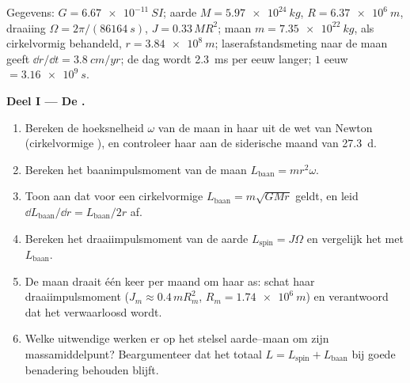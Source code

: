 \begin{problem}
\label{pb:b1:angular-momentum:1}
Gegevens: $G = \qty{6.67e-11}{SI}$; aarde $M = \qty{5.97e24}{kg}$, $R =
\qty{6.37e6}{m}$, draaiing $\Omega = 2\pi/(\qty{86164}{s})$, 
$J = 0.33\,MR^2$; maan $m = \qty{7.35e22}{kg}$,  als
cirkelvormig behandeld, $r = \qty{3.84e8}{m}$; laserafstandsmeting naar de maan geeft
$\dd r/\dd t = \qty{3.8}{cm/yr}$; de dag wordt \qty{2.3}{ms} per
eeuw langer; $1$ eeuw $= \qty{3.16e9}{s}$.

\medskip
\noindent\textbf{Deel I --- De .}
\begin{enumerate}
  \item Bereken de hoeksnelheid $\omega$ van de maan in haar  uit
        de wet van Newton (cirkelvormige ), en controleer haar aan de
        siderische maand van \qty{27.3}{d}.
  \item Bereken het baanimpulsmoment van de maan $L_{\text{baan}} =
        mr^2\omega$.
  \item Toon aan dat voor een cirkelvormige  $L_{\text{baan}} = m\sqrt{GMr}$ geldt, en
        leid $\dd L_{\text{baan}}/\dd r = L_{\text{baan}}/2r$ af.
  \item Bereken het draaiimpulsmoment van de aarde $L_{\text{spin}} =
        J\Omega$ en vergelijk het met $L_{\text{baan}}$.
  \item De maan draait één keer per maand om haar as: schat haar
        draaiimpulsmoment ($J_m \approx 0.4\,mR_m^2$, $R_m = \qty{1.74e6}{m}$) en
        verantwoord dat het verwaarloosd wordt.
  \item Welke uitwendige  werken er op het stelsel aarde--maan om zijn
        massamiddelpunt? Beargumenteer dat het totaal
        $L = L_{\text{spin}} + L_{\text{baan}}$ bij goede benadering behouden blijft.
\end{enumerate}


\end{problem}
